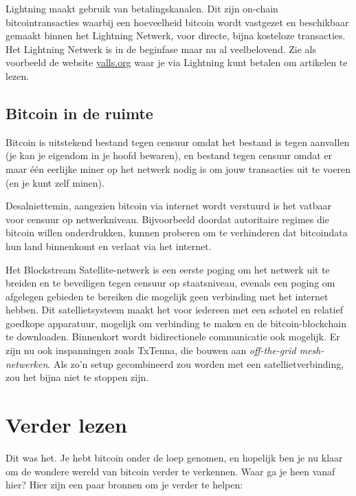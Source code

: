 \documentclass[smalldemyvopaper,11pt,twoside,onecolumn,openright,extrafontsizes]{memoir}
\begin{document}
Lightning maakt gebruik van betalingskanalen. Dit zijn on-chain bitcointransacties waarbij een hoeveelheid bitcoin wordt vastgezet en beschikbaar gemaakt binnen het Lightning Netwerk, voor directe, bijna kosteloze transacties. Het Lightning Netwerk is in de beginfase maar nu al veelbelovend. Zie als voorbeeld de website \href{https://yalls.org}{yalls.org} waar je via Lightning kunt betalen om artikelen te lezen.  

\section{Bitcoin in de ruimte}

Bitcoin is uitstekend bestand tegen censuur omdat het bestand is tegen aanvallen (je kan je eigendom in je hoofd bewaren), en bestand tegen censuur omdat er maar één eerlijke miner op het netwerk nodig is om jouw transacties uit te voeren (en je kunt zelf minen). 

Desalniettemin, aangezien bitcoin via internet wordt verstuurd is het vatbaar voor censuur op netwerkniveau. Bijvoorbeeld doordat autoritaire regimes die bitcoin willen onderdrukken, kunnen proberen om te verhinderen dat bitcoindata hun land binnenkomt en verlaat via het internet.

Het Blockstream Satellite-netwerk is een eerste poging om het netwerk uit te breiden en te beveiligen tegen censuur op staatsniveau, evenals een poging om afgelegen gebieden te bereiken die mogelijk geen verbinding met het internet hebben. Dit satellietsysteem maakt het voor iedereen met een schotel en relatief goedkope apparatuur, mogelijk om verbinding te maken en de bitcoin-blockchain te downloaden. Binnenkort wordt bidirectionele communicatie ook mogelijk. Er zijn nu ook inspanningen zoals TxTenna, die bouwen aan \textit{off-the-grid mesh-netwerken}. Als zo'n setup gecombineerd zou worden met een satellietverbinding, zou het bijna niet te stoppen zijn.

\backmatter

\chapter*{Verder lezen}

Dit was het. Je hebt bitcoin onder de loep genomen, en hopelijk ben je nu klaar om de wondere wereld van bitcoin verder te verkennen. Waar ga je heen vanaf hier? Hier zijn een paar bronnen om je verder te helpen:
\end{document}
